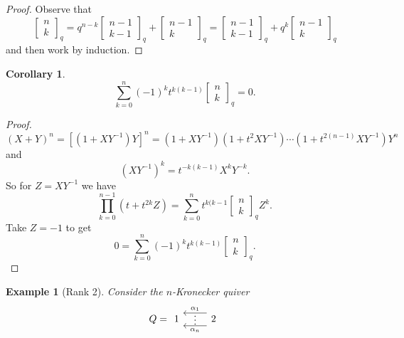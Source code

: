 \documentclass{book}
\newtheorem{corollary}[theorem]{Corollary}
\newtheorem{example}{Example}[section]
\begin{document}
    \begin{proof}
        Observe that \[\begin{bmatrix}n\\ k\end{bmatrix}_q=q^{n-k}\begin{bmatrix}n-1\\ k-1\end{bmatrix}_q+\begin{bmatrix}n-1\\ k\end{bmatrix}_q = \begin{bmatrix}n-1\\ k-1\end{bmatrix}_q+q^k\begin{bmatrix}n-1\\ k\end{bmatrix}_q\] and then work by induction.
    \end{proof}
    
    \begin{corollary}
        \[\sum_{k=0}^n (-1)^k t^{k(k-1)}\begin{bmatrix}n\\ k\end{bmatrix}_q=0.\]
    \end{corollary}
    
    \begin{proof}
        \[(X+Y)^n=\left[(1+XY^{-1})Y\right]^n=(1+XY^{-1})(1+t^2XY^{-1})\cdots(1+t^{2(n-1)}XY^{-1})Y^n\]
        and \[(XY^{-1})^k=t^{-k(k-1)}X^kY^{-k}.\] So for $Z=XY^{-1}$ we have 
        \[\prod_{k=0}^{n-1} (t+t^{2k}Z)=\sum_{k=0}^nt^{k(k-1}\begin{bmatrix}n\\ k\end{bmatrix}_qZ^k.\]
        Take $Z=-1$ to get \[0=\sum_{k=0}^n (-1)^k t^{k(k-1)}\begin{bmatrix}n\\ k\end{bmatrix}_q.\]
    \end{proof}
    
    \begin{example}[Rank 2]
        Consider the $n$-Kronecker quiver \[ Q= \begin{tikzcd}
			1  &   \arrow[l, "\alpha_1"',yshift=1.5ex]  \arrow[l, phantom, "{\vdots}"',yshift=.5ex]     \arrow[l,"\alpha_n",yshift=-1.5ex] 2
			\end{tikzcd} \]
    \end{example}
    
\end{document}
